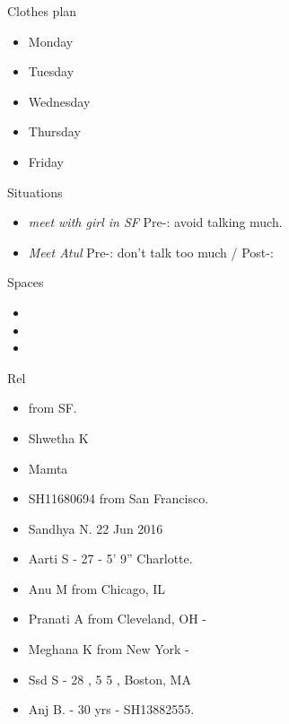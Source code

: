\documentclass[serif, mathserif, final]{beamer}
\begin{document}
\begin{frame}
\begin{columns}
\begin{column}{0.25\linewidth}
      \begin{block}{Clothes plan} 
        \begin{itemize}
          \tiny \item \tiny Monday
        \item \tiny Tuesday
        \item \tiny Wednesday
        \item \tiny Thursday
        \item \tiny Friday
        \end{itemize} 
      \end{block}

      \begin{block}{Situations}
        \begin{itemize}
        \tiny \item \tiny \textit{meet with girl in SF} Pre-: avoid talking much.
      \item \tiny \textit{Meet Atul} Pre-:  don't talk too much    /  Post-: 
        \end{itemize} 
      \end{block} 

\begin{block}{Spaces}
\begin{itemize} 
\tiny \item \tiny 
\item \tiny 
\item \tiny 
\end{itemize} 
\end{block} 

\begin{block}{Rel}

  \begin{itemize} 
    \small \item \small  from SF. 
    \item \small Shwetha K 
    \item \small Mamta       
    \item \small SH11680694 from San Francisco. 
    \item \small Sandhya N. 22 Jun 2016 
    \item \small Aarti S - 27 - 5' 9'' Charlotte.       
    \item \small Anu M from Chicago, IL 
    \item \small Pranati A from Cleveland, OH - 
    \item \small Meghana K from New York - 
    \item \small Ssd S - 28 , 5 5 , Boston, MA 
    \item \small Anj B. - 30 yrs - SH13882555.
  \end{itemize} 


\end{block}
\end{column}
\end{columns}
\end{frame}
\end{document}
